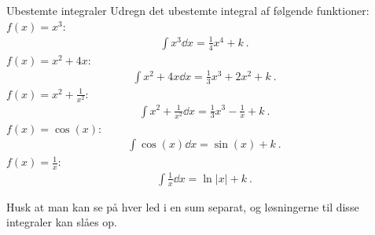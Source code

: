\begin{opgave}{Ubestemte integraler}
	Udregn det ubestemte integral af følgende funktioner:
	\opg $f(x) = x^3$:
    	\begin{align*}
    	    \int x^3\dd{x}=\frac{1}{4}x^4+k \: .
    	\end{align*}
	\opg $f(x) = x^2 + 4x$:
    	\begin{align*}
    	    \int x^2+4x\dd{x}=\frac{1}{3}x^3+2x^2+k \: .
    	\end{align*}
	\opg $f(x) = x^2 + \frac{1}{x^2}$:
	    \begin{align*}
	        \int x^2+\frac{1}{x^2}\dd{x}=\frac{1}{3}x^3-\frac{1}{x}+k \: .
	    \end{align*}
	\opg $f(x) = \cos (x)$:
	    \begin{align*}
	        \int \cos(x)\dd{x}=\sin(x)+k \: .
	    \end{align*}
	\opg $f(x) = \frac{1}{x}$:
	    \begin{align*}
	        \int\frac{1}{x}\dd{x}=\ln|x|+k \: .
	    \end{align*}
    
    Husk at man kan se på hver led i en sum separat, og løsningerne til disse integraler kan slåes op.
\end{opgave}
